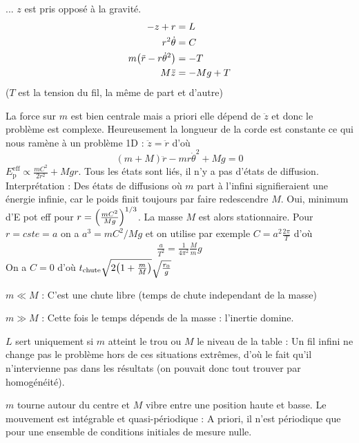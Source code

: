 \begin{solution}
\begin{questions}
        \questioncours ...
        \question $z$ est pris opposé à la gravité.
        \begin{align*}
            -z + r &= L \\ 
            r^2\dot\theta &= C \\
            m \qty(\ddot{r} - r{\dot{\theta}}^2 ) &= -T \\
            M \ddot{z} &= - M g + T
        \end{align*}
        ($T$ est la tension du fil, la même de part et d'autre)
        
        La force sur $m$ est bien centrale mais a priori elle dépend de $\ddot{z}$ et donc le problème est complexe. Heureusement la longueur de la corde est constante ce qui nous ramène à un problème 1D : $\ddot{z} = \ddot{r}$ d'où
        $$ (m+M)\ddot{r} - mr {\dot{\theta}}^2 + Mg = 0$$
        \question $E_{\text{p}}^{\text{eff}} \propto \frac{mC^2}{2r^2} + Mgr$. Tous les états sont liés, il n'y a pas d'états de diffusion. Interprétation : Des états de diffusions où $m$ part à l'infini signifieraient une énergie infinie, car le poids finit toujours par faire redescendre $M$.
        \question Oui, minimum d'E pot eff pour $r = \qty(\frac{mC^2}{Mg})^{1/3}$. La masse $M$ est alors stationnaire.
        \question Pour $r = cste = a$ on a $a^3 = mC^2/Mg $ et on utilise par exemple $C=a^2\frac{2\pi}{T}$ d'où \begin{align}
            \frac{a}{T^2} = \frac1{4\pi^2}\frac{M}{m} g
        \end{align}
        \question On a $C = 0$ d'où $t_\text{chute} \sqrt{2\qty(1 + \frac{m}{M})}\sqrt{\frac{r_0}{g}}$
        
        $m \ll M$ : C'est une chute libre (temps de chute independant de la masse)
        
        $m \gg M$ : Cette fois le temps dépends de la masse : l'inertie domine.
    
    \questionbonus $L$ sert uniquement si $m$ atteint le trou ou $M$ le niveau de la table : Un fil infini ne change pas le problème hors de ces situations extrêmes, d'où le fait qu'il n'intervienne pas dans les résultats (on pouvait donc tout trouver par homogénéité).
    
    \questionbonus $m$ tourne autour du centre et $M$ vibre entre une position haute et basse. Le mouvement est intégrable et quasi-périodique : A priori, il n'est périodique que pour une ensemble de conditions initiales de mesure nulle.
\end{questions}
\end{solution}